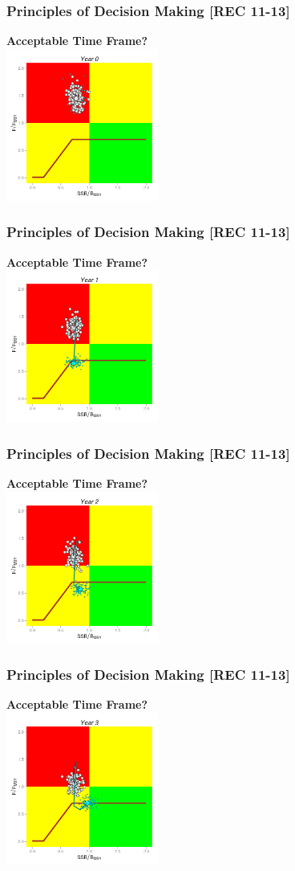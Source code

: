 \begin{frame}\frametitle{Principles of Decision Making [REC 11-13]} \smallskip\textbf{Acceptable Time Frame?}\smallskip\\ \includegraphics[height=50mm,width=50mm]{hcrII1.png}\end{frame}
\begin{frame}\frametitle{Principles of Decision Making [REC 11-13]} \smallskip\textbf{Acceptable Time Frame?}\smallskip\\ \includegraphics[height=50mm,width=50mm]{hcrII2.png}\end{frame}
\begin{frame}\frametitle{Principles of Decision Making [REC 11-13]} \smallskip\textbf{Acceptable Time Frame?}\smallskip\\ \includegraphics[height=50mm,width=50mm]{hcrII3.png}\end{frame}
\begin{frame}\frametitle{Principles of Decision Making [REC 11-13]} \smallskip\textbf{Acceptable Time Frame?}\smallskip\\ \includegraphics[height=50mm,width=50mm]{hcrII4.png}\end{frame}
